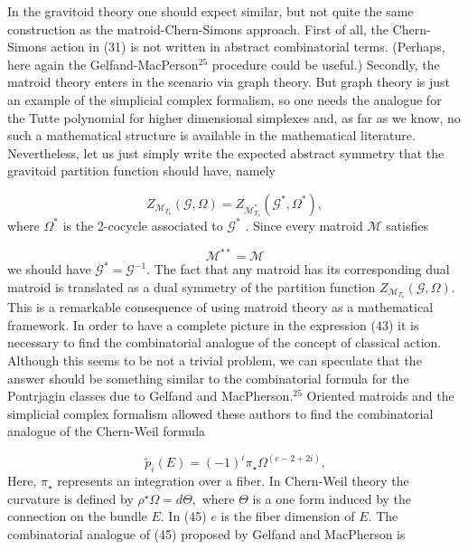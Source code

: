\documentclass[a4paper,12pt]{article}
\begin{document}
In the gravitoid theory one should expect similar, but not quite the same
construction as the matroid-Chern-Simons approach. First of all, the
Chern-Simons action in (31) is not written in abstract combinatorial terms.
(Perhaps, here again the Gelfand-MacPerson$^{25}$ procedure could be
useful.) Secondly, the matroid theory enters in the scenario via graph
theory. But graph theory is just an example of the simplicial complex
formalism, so one needs the analogue for the Tutte polynomial for higher
dimensional simplexes and, as far as we know, no such a mathematical
structure is available in the mathematical literature. Nevertheless, let us
just simply write the expected abstract symmetry that the gravitoid
partition function should have, namely

\begin{equation}
Z_{\mathcal{M}_{T_{b}}}(\mathcal{G},\Omega )=Z_{\mathcal{M}_{T_{b}}^{\ast }}(%
\mathcal{G}^{\ast },\Omega ^{\ast }),  \label{43}
\end{equation}
where $\Omega ^{\ast }$ is the 2-cocycle associated to $\mathcal{G}^{\ast }$%
. Since every matroid $\mathcal{M}$ satisfies

\begin{equation}
\mathcal{M}^{\ast \ast }=\mathcal{M}  \label{44}
\end{equation}
we should have $\mathcal{G}^{\ast }=\mathcal{G}^{-1}$. The fact that any
matroid has its corresponding dual matroid is translated as a dual symmetry
of the partition function $Z_{\mathcal{M}_{T_{b}}}(\mathcal{G},\Omega )$.
This is a remarkable consequence of using matroid theory as a mathematical
framework. In order to have a complete picture in the expression (43) it is
necessary to find the combinatorial analogue of the concept of classical
action. Although this seems to be not a trivial problem, we can speculate
that the answer should be something similar to the combinatorial formula for
the Pontrjagin classes due to Gelfand and MacPherson.$^{25}$ Oriented
matroids and the simplicial complex formalism allowed these authors to find
the combinatorial analogue of the Chern-Weil formula

\begin{equation}
\tilde{p}_{i}(E)=(-1)^{i}\pi _{\star }\Omega ^{(e-2+2i)}.  \label{45}
\end{equation}
Here, $\pi _{\star }$ represents an integration over a fiber. In Chern-Weil
theory the curvature is defined by $\rho ^{\star }\Omega =d\Theta ,$ where $%
\Theta $ is a one form induced by the connection on the bundle $E$. In (45) $%
e$ is the fiber dimension of $E$. The combinatorial analogue of (45)
proposed by Gelfand and MacPherson is
\end{document}
